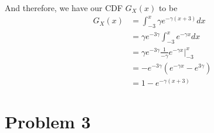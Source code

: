 \documentclass[preprint,12pt]{elsarticle}
\begin{document}
\begin{enumerate}
        And therefore, we have our CDF $G_X(x)$ to be 
        \begin{align*}
            G_X(x) &= \int_{-3}^{x} \gamma e^{-\gamma(x+3)}dx\\
                    &= \gamma e^{-3\gamma}\int_{-3}^{x} e^{-\gamma x}dx\\
                    &= \gamma e^{-3\gamma}\frac{1}{-\gamma}e^{-\gamma x} \Big|_{-3}^{x}\\
                    &= -e^{-3\gamma}(e^{-\gamma x} - e^{3\gamma}) \\
                    &= 1 - e^{-\gamma(x+3)}
        \end{align*}
    \end{enumerate}

    \section{Problem 3}
\end{document}
